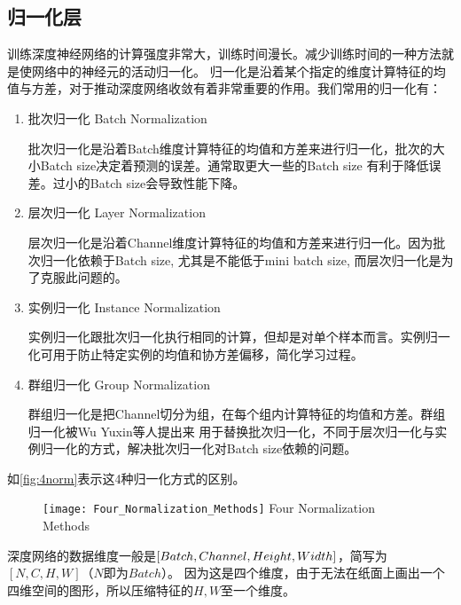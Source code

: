\subsection{归一化层}
训练深度神经网络的计算强度非常大，训练时间漫长。减少训练时间的一种方法就是使网络中的神经元的活动归一化\cite{Ba2016LayerN}。
归一化是沿着某个指定的维度计算特征的均值与方差，对于推动深度网络收敛有着非常重要的作用。我们常用的归一化有：
\begin{enumerate}
    \item {批次归一化 Batch Normalization\cite{Ioffe2015BatchNA}}
    
    批次归一化是沿着Batch维度计算特征的均值和方差来进行归一化，批次的大小Batch size决定着预测的误差。通常取更大一些的Batch size
    有利于降低误差。过小的Batch size会导致性能下降。
    \item {层次归一化 Layer Normalization\cite{Ba2016LayerN}}
    
    层次归一化是沿着Channel维度计算特征的均值和方差来进行归一化。因为批次归一化依赖于Batch size, 尤其是不能低于mini batch size,
    而层次归一化是为了克服此问题的。
    \item {实例归一化 Instance Normalization\cite{Ulyanov2016InstanceNT}}
    
    实例归一化跟批次归一化执行相同的计算，但却是对单个样本而言。实例归一化可用于防止特定实例的均值和协方差偏移，简化学习过程。
    \item {群组归一化 Group Normalization\cite{Wu2018GroupN}}
    
    群组归一化是把Channel切分为组，在每个组内计算特征的均值和方差。群组归一化被Wu Yuxin等人\cite{Wu2018GroupN}提出来
    用于替换批次归一化，不同于层次归一化与实例归一化的方式，解决批次归一化对Batch size依赖的问题。
\end{enumerate}
如\autoref{fig:4norm}表示这4种归一化方式的区别。
\begin{figure}[!htp]
    \centering
    \texttt{[image: Four\_Normalization\_Methods]}
        {Four Normalization Methods}
    \label{fig:4norm}
\end{figure}
深度网络的数据维度一般是$[Batch, Channel, \\Height, Width]$，简写为$[N, C, H, W]$（$N$即为$Batch$）。
因为这是四个维度，由于无法在纸面上画出一个四维空间的图形，所以压缩特征的$H, W$至一个维度。
